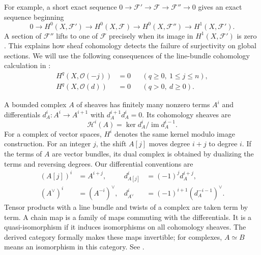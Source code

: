 \documentclass[12pt,reqno,a4paper]{amsart}
\numberwithin{equation}{section}
\numberwithin{figure}{section}
\theoremstyle{plain}
\theoremstyle{definition}
\begin{document}
For example, a short exact sequence
$0\to\mathcal F'\to\mathcal F\to\mathcal F''\to0$
gives an exact sequence beginning
\begin{equation}\label{app:eq:sections-long-exact}
 0\longrightarrow H^0(X,\mathcal F')
 \longrightarrow H^0(X,\mathcal F)
 \longrightarrow H^0(X,\mathcal F'')
 \longrightarrow H^1(X,\mathcal F').
\end{equation}
A section of $\mathcal F''$ lifts to one of $\mathcal F$ precisely
when its image in $H^1(X,\mathcal F')$ is zero
\cite[Chapter~III, Theorem~1.1A(c) and Proposition~2.6]{Hartshorne}.
This explains how sheaf cohomology detects the failure of surjectivity
on global sections.
We will use the following consequences of the line-bundle cohomology
calculation in \cite[Chapter~III, Theorem~5.1]{Hartshorne}:
\begin{equation}\label{eq:projective-line-bundle-vanishing}
 \begin{aligned}
 H^q(X,\mathcal O(-j))&=0
       &&(q\geq0,\ 1\leq j\leq n),\\
 H^q(X,\mathcal O(d))&=0
       &&(q>0,\ d\geq0).
 \end{aligned}
\end{equation}

A bounded complex $A$ of sheaves has finitely many nonzero terms $A^i$
and differentials $d_A^i:A^i\to A^{i+1}$ with $d_A^{i+1}d_A^i=0$.
Its cohomology sheaves are
\begin{equation}\label{app:eq:complex-cohomology}
 \mathcal H^i(A)=\ker d_A^i/\operatorname{im}d_A^{i-1}.
\end{equation}
For a complex of vector spaces, $H^i$ denotes the same kernel modulo
image construction. For an integer $j$, the shift $A[j]$ moves degree
$i+j$ to degree $i$. If the terms of $A$ are vector bundles, its dual
complex is obtained by dualizing the terms and reversing degrees.
Our differential conventions are
\begin{equation}\label{app:eq:complex-shift-dual}
 \begin{aligned}
 (A[j])^i&=A^{i+j},& d_{A[j]}^i&=(-1)^j d_A^{i+j},\\
 (A^\vee)^i&=(A^{-i})^\vee,
 &d_{A^\vee}^i&=(-1)^{i+1}(d_A^{-i-1})^\vee.
 \end{aligned}
\end{equation}
Tensor products with a line bundle and twists of a complex are taken
term by term. A chain map is a family of maps commuting with the
differentials. It is a quasi-isomorphism if it induces isomorphisms
on all cohomology sheaves. The derived category formally makes these
maps invertible; for complexes, $A\simeq B$ means an isomorphism in
this category. See \cite[Tag~05RR]{Stacks}.
\end{document}
